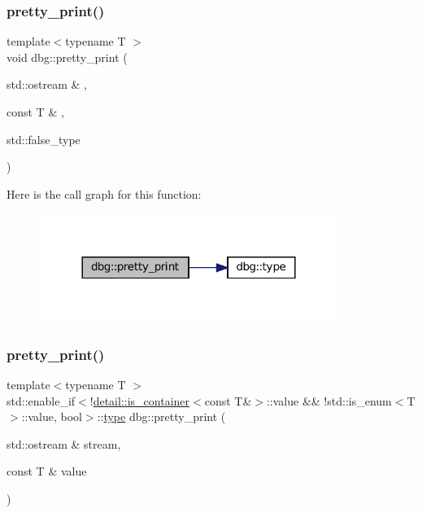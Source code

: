 \subsubsection{\texorpdfstring{pretty\+\_\+print()}{pretty\_print()}\hspace{0.1cm}{\footnotesize\ttfamily [2/19]}}
{\footnotesize\ttfamily template$<$typename T $>$ \\
void dbg\+::pretty\+\_\+print (\begin{DoxyParamCaption}\item[{std\+::ostream \&}]{,  }\item[{const T \&}]{,  }\item[{std\+::false\+\_\+type}]{ }\end{DoxyParamCaption})\hspace{0.3cm}{\ttfamily [inline]}}

Here is the call graph for this function\+:
\nopagebreak
\begin{figure}[H]
\begin{center}
\leavevmode
\includegraphics[width=276pt]{namespacedbg_ab875770941388a1d8279e9b5257e5a93_cgraph}
\end{center}
\end{figure}
\mbox{\label{namespacedbg_a4920208faa7096e0333f9d14119a9c2f}} 
\subsubsection{\texorpdfstring{pretty\+\_\+print()}{pretty\_print()}\hspace{0.1cm}{\footnotesize\ttfamily [3/19]}}
{\footnotesize\ttfamily template$<$typename T $>$ \\
std\+::enable\+\_\+if$<$!\hyperlink{structdbg_1_1detail_1_1is__container}{detail\+::is\+\_\+container}$<$const T\&$>$\+::value \&\& !std\+::is\+\_\+enum$<$T$>$\+::value, bool$>$\+::\hyperlink{namespacedbg_a2365d80e3a3525e6025040383ff8661b}{type} dbg\+::pretty\+\_\+print (\begin{DoxyParamCaption}\item[{std\+::ostream \&}]{stream,  }\item[{const T \&}]{value }\end{DoxyParamCaption})\hspace{0.3cm}{\ttfamily [inline]}}

